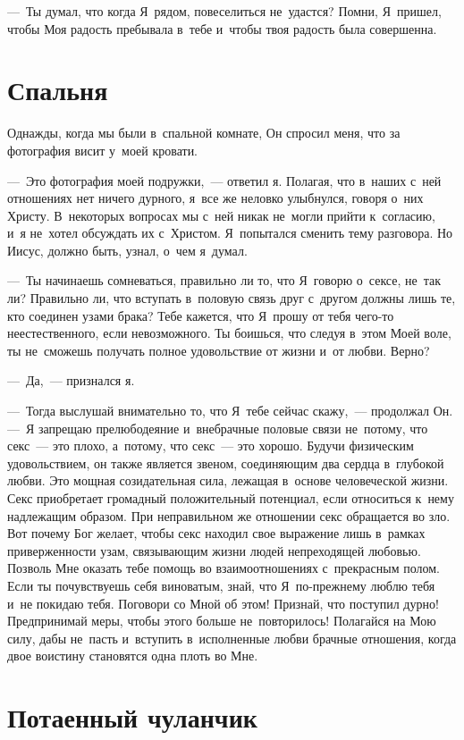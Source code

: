 \documentclass[12pt,article,a4paper,fittopage]{ncc}
\begin{document}
\begin{multicols}{2}
---~Ты думал, что когда Я~рядом, повеселиться не~удастся? Помни, Я~пришел, чтобы Моя радость пребывала в~тебе и~чтобы твоя радость была совершенна.

\section*{Спальня}

Однажды, когда мы были в~спальной комнате, Он спросил меня, что за фотография висит у~моей кровати.

---~Это фотография моей подружки,~--- ответил я. Полагая, что в~наших с~ней отношениях нет ничего дурного, я~все же неловко улыбнулся, говоря о~них Христу. В~некоторых вопросах мы с~ней никак не~могли прийти к~согласию, и~я не~хотел обсуждать их с~Христом. Я~попытался сменить тему разговора. Но Иисус, должно быть, узнал, о~чем я~думал. 

---~Ты начинаешь сомневаться, правильно ли то, что Я~говорю о~сексе, не~так ли? Правильно ли, что вступать в~половую связь друг с~другом должны лишь те, кто соединен узами брака? Тебе кажется, что Я~прошу от тебя чего-то неестественного, если невозможного. Ты боишься, что следуя в~этом Моей воле, ты не~сможешь получать полное удовольствие от жизни и~от любви. Верно?

---~Да,~--- признался я.

---~Тогда выслушай внимательно то, что Я~тебе сейчас скажу,~--- продолжал Он. ---~Я запрещаю прелюбодеяние и~внебрачные половые связи не~потому, что секс~--- это плохо, а~потому, что секс~--- это хорошо. Будучи физическим удовольствием, он также является звеном, соединяющим два сердца в~глубокой любви. Это мощная созидательная сила, лежащая в~основе человеческой жизни. Секс приобретает громадный положительный потенциал, если относиться к~нему надлежащим образом. При неправильном же отношении секс обращается во зло. Вот почему Бог желает, чтобы секс находил свое выражение лишь в~рамках приверженности узам, связывающим жизни людей непреходящей любовью. Позволь Мне оказать тебе помощь во взаимоотношениях с~прекрасным полом. Если ты почувствуешь себя виноватым, знай, что Я~по-прежнему люблю тебя и~не покидаю тебя. Поговори со Мной об этом! Признай, что поступил дурно! Предпринимай меры, чтобы этого больше не~повторилось! Полагайся на Мою силу, дабы не~пасть и~вступить в~исполненные любви брачные отношения, когда двое воистину становятся одна плоть во Мне.

\pagestyle{lheadings}
\section*{Потаенный чуланчик}


\end{multicols}
\end{document}
